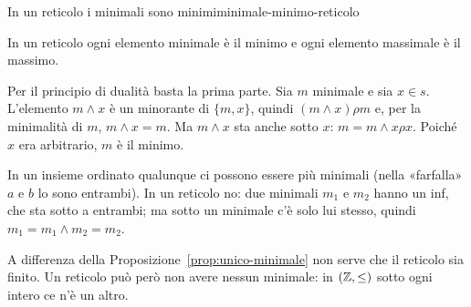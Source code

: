 \begin{concetto}
\begin{Proposizione}{In un reticolo i minimali sono minimi}{minimale-minimo-reticolo}
    \begin{prerequisiti}
    \end{prerequisiti}
    In un reticolo ogni elemento minimale è il minimo e ogni elemento massimale è il massimo.
\end{Proposizione}
\begin{dimostrazione}
    Per il principio di dualità basta la prima parte. Sia $m$ minimale e sia $x \in s$. L'elemento $m \wedge x$ è un minorante di $\{m, x\}$, quindi
    $(m \wedge x) \rho m$ e, per la minimalità di $m$, $m \wedge x = m$. Ma $m \wedge x$ sta anche sotto $x$: $m = m \wedge x \rho x$. Poiché $x$ era arbitrario, $m$ è il minimo.
\end{dimostrazione}
\end{concetto}

\begin{spiegazione}
    In un insieme ordinato qualunque ci possono essere più minimali (nella «farfalla» $a$ e $b$ lo sono entrambi). In un reticolo no: due
    minimali $m_1$ e $m_2$ hanno un inf, che sta sotto a entrambi; ma sotto un minimale c'è solo lui stesso, quindi $m_1 = m_1 \wedge m_2 = m_2$.
    \begin{center}
    \end{center}
    A differenza della Proposizione~\ref{prop:unico-minimale} non serve che il reticolo sia finito. Un reticolo può però non avere
    nessun minimale: in $(\mathbb{Z}, \leq)$ sotto ogni intero ce n'è un altro.
\end{spiegazione}

\newpage
